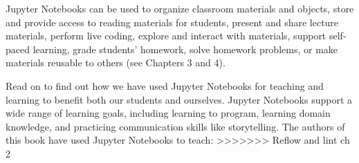 \documentclass[]{book}
\begin{document}
Jupyter Notebooks can be used to organize classroom materials and
objects, store and provide access to reading materials for students,
present and share lecture materials, perform live coding, explore and
interact with materials, support self-paced learning, grade students'
homework, solve homework problems, or make materials reusable to others
(see Chapters 3 and 4).

Read on to find out how we have used Jupyter Notebooks for teaching and
learning to benefit both our students and ourselves. Jupyter Notebooks
support a wide range of learning goals, including learning to program,
learning domain knowledge, and practicing communication skills like
storytelling. The authors of this book have used Jupyter Notebooks to
teach:
\textgreater{}\textgreater{}\textgreater{}\textgreater{}\textgreater{}\textgreater{}\textgreater{}
Reflow and lint ch 2
\end{document}
